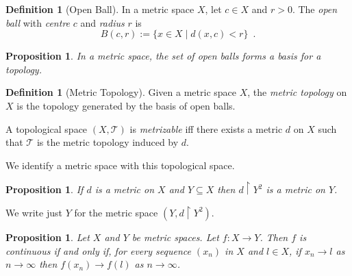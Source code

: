 \documentclass{book}
\newtheorem{prop}[ax]{Proposition}
\theoremstyle{definition}
\newtheorem{df}[ax]{Definition}
\begin{document}
\begin{df}[Open Ball]
In a metric space $X$, let $c \in X$ and $r > 0$. The \emph{open ball} with \emph{centre} $c$ and \emph{radius} $r$ is
\[ B(c,r) := \{ x \in X \mid d(x,c) < r \} \enspace . \]
\end{df}

\begin{prop}
In a metric space, the set of open balls forms a basis for a topology.
\end{prop}

\begin{df}[Metric Topology]
Given a metric space $X$, the \emph{metric topology} on $X$ is the topology generated by the basis of open balls.

A topological space $(X, \mathcal{T})$ is \emph{metrizable} iff there exists a metric $d$ on $X$ such that $\mathcal{T}$ is the metric topology induced by $d$.
\end{df}

We identify a metric space with this topological space.

\begin{prop}
If $d$ is a metric on $X$ and $Y \subseteq X$ then $d \restriction Y^2$ is a metric on $Y$.
\end{prop}

We write just $Y$ for the metric space $(Y, d \restriction Y^2)$.

\begin{prop}
Let $X$ and $Y$ be metric spaces. Let $f : X \rightarrow Y$. Then $f$ is continuous if and only if, for every sequence $(x_n)$ in $X$ and $l \in X$, if $x_n \rightarrow l$ as $n \rightarrow \infty$ then $f(x_n) \rightarrow f(l)$ as $n \rightarrow \infty$.
\end{prop}
\end{document}
